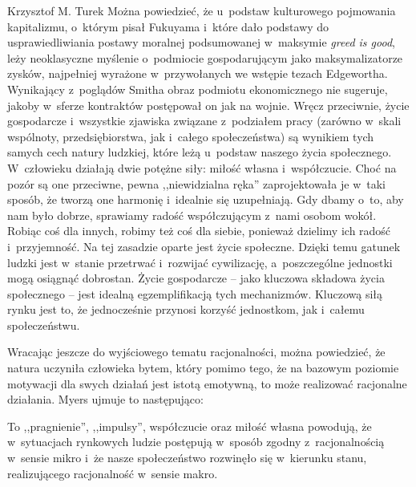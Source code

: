 \begin{artplenv}{Krzysztof M. Turek}
Można powiedzieć, że u~podstaw kulturowego pojmowania kapitalizmu, o~którym pisał Fukuyama i~które dało podstawy do
usprawiedliwiania postawy moralnej podsumowanej w~maksymie \textit{greed is good}, leży neoklasyczne
myślenie o~podmiocie gospodarującym jako maksymalizatorze zysków, najpełniej wyrażone w~przywołanych we wstępie
tezach Edgewortha. Wynikający z~poglądów Smitha obraz podmiotu ekonomicznego nie sugeruje,
jakoby w~sferze kontraktów postępował on jak na
wojnie. Wręcz przeciwnie, życie gospodarcze i~wszystkie zjawiska związane z~podziałem pracy (zarówno w~skali wspólnoty,
przedsiębiorstwa, jak i~całego społeczeństwa) są wynikiem tych samych cech natury ludzkiej, które leżą u~podstaw
naszego życia społecznego. W~człowieku działają dwie potężne siły: miłość własna i~współczucie. Choć na pozór są one
przeciwne, pewna ,,niewidzialna ręka'' zaprojektowała je w~taki sposób, że tworzą one harmonię i~idealnie się
uzupełniają. Gdy dbamy o~to, aby nam było dobrze, sprawiamy radość współczującym z~nami osobom wokół. Robiąc coś dla
innych, robimy też coś dla siebie, ponieważ dzielimy ich radość i~przyjemność. Na tej zasadzie oparte jest życie
społeczne. Dzięki temu gatunek ludzki jest w~stanie przetrwać i~rozwijać cywilizację, a~poszczególne jednostki mogą
osiągnąć dobrostan. Życie gospodarcze -- jako kluczowa składowa życia społecznego -- jest idealną egzemplifikacją tych
mechanizmów. Kluczową siłą rynku jest to, że jednocześnie przynosi korzyść jednostkom, jak i~całemu społeczeństwu.

Wracając jeszcze do wyjściowego tematu racjonalności, można powiedzieć, że natura uczyniła człowieka bytem, który pomimo
tego, że na bazowym poziomie motywacji dla swych działań jest istotą emotywną, to może realizować racjonalne działania.
Myers
\parencite*[s.~95]{myers_soul_1983}
ujmuje to następująco:

To ,,pragnienie'', ,,impulsy'', współczucie oraz miłość własna powodują, że w~sytuacjach rynkowych ludzie postępują w~sposób
zgodny z~racjonalnością w~sensie mikro i~że nasze społeczeństwo rozwinęło się w~kierunku stanu, realizującego
racjonalność w~sensie makro.

\end{artplenv}\label{turek-stop}
